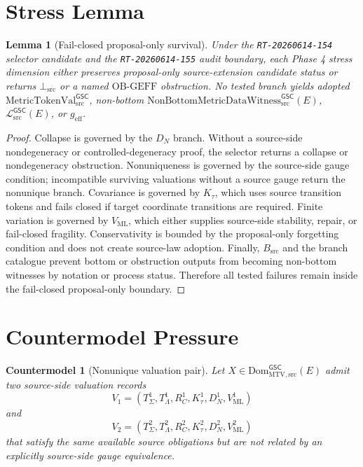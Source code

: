 \documentclass[11pt]{article}
\newcommand{\MetricTokenVal}{\mathrm{MetricTokenVal}_{\mathrm{src}}^{\mathsf{GSC}}}
\newcommand{\DomMTV}{\mathrm{Dom}_{\mathrm{MTV,src}}^{\mathsf{GSC}}}
\newcommand{\MetricData}{\mathcal{L}_{\mathrm{src}}^{\mathsf{GSC}}}
\newcommand{\Witness}{\mathrm{NonBottomMetricDataWitness}_{\mathrm{src}}^{\mathsf{GSC}}}
\newcommand{\BottomSrc}{\bot_{\mathrm{src}}}
\newcommand{\OBGEFF}{\mathrm{OB\mbox{-}GEFF}}
\newcommand{\geff}{g_{\mathrm{eff}}}
\newtheorem{lemma}{Lemma}
\newtheorem{countermodel}{Countermodel}
\begin{document}
\section{Stress Lemma}

\begin{lemma}[Fail-closed proposal-only survival]
Under the \texttt{RT-20260614-154} selector candidate and the
\texttt{RT-20260614-155} audit boundary, each Phase 4 stress dimension either
preserves proposal-only source-extension candidate status or returns
\(\BottomSrc\) or a named \(\OBGEFF\) obstruction. No tested branch yields
adopted \(\MetricTokenVal\), non-bottom \(\Witness(E)\),
\(\MetricData(E)\), or \(\geff\).
\end{lemma}

\begin{proof}
Collapse is governed by the \(D_N\) branch. Without a source-side
nondegeneracy or controlled-degeneracy proof, the selector returns a collapse
or nondegeneracy obstruction. Nonuniqueness is governed by the source-side
gauge condition; incompatible surviving valuations without a source gauge
return the nonunique branch. Covariance is governed by \(K_{\tau}\), which
uses source transition tokens and fails closed if target coordinate
transitions are required. Finite variation is governed by \(V_{\mathrm{ML}}\),
which either supplies source-side stability, repair, or fail-closed fragility.
Conservativity is bounded by the proposal-only forgetting condition and does
not create source-law adoption. Finally, \(B_{\mathrm{src}}\) and the branch
catalogue prevent bottom or obstruction outputs from becoming non-bottom
witnesses by notation or process status. Therefore all tested failures remain
inside the fail-closed proposal-only boundary.
\end{proof}

\section{Countermodel Pressure}

\begin{countermodel}[Nonunique valuation pair]
Let \(X\in\DomMTV(E)\) admit two source-side valuation records
\[
  V_1=(T_{\Sigma}^{1},T_{\Lambda}^{1},R_C^{1},K_{\tau}^{1},D_N^{1},V_{\mathrm{ML}}^{1})
\]
and
\[
  V_2=(T_{\Sigma}^{2},T_{\Lambda}^{2},R_C^{2},K_{\tau}^{2},D_N^{2},V_{\mathrm{ML}}^{2})
\]
that satisfy the same available source obligations but are not related by an
explicitly source-side gauge equivalence.
\end{countermodel}
\end{document}
